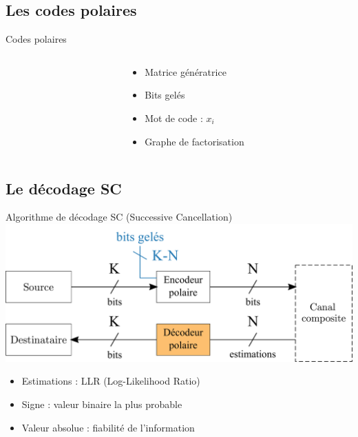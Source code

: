 \subsection*{Les codes polaires}
\begin{frame}[c]{Codes polaires}
	\begin{columns}[T] %
		\begin{column}{.65\textwidth}
		\end{column}
		\begin{column}{.35\textwidth}
		\begin{itemize}
			\item<1-> Matrice génératrice
			\item<2-> Bits gelés
			\item<3-> Mot de code : $x_i$
			\item<4-> Graphe de factorisation
		\end{itemize}
		\end{column}

	\end{columns}

\end{frame}
\subsection*{Le décodage SC}

\begin{frame}[c]{Algorithme de décodage SC (Successive Cancellation)}
	\includegraphics[width=.8\textwidth]{fig/decoder_in_chain.pdf}
	\begin{itemize}
		\item Estimations : LLR (Log-Likelihood Ratio)
		\item Signe : valeur binaire la plus probable
		\item Valeur absolue : fiabilité de l'information
	\end{itemize}
\end{frame}

